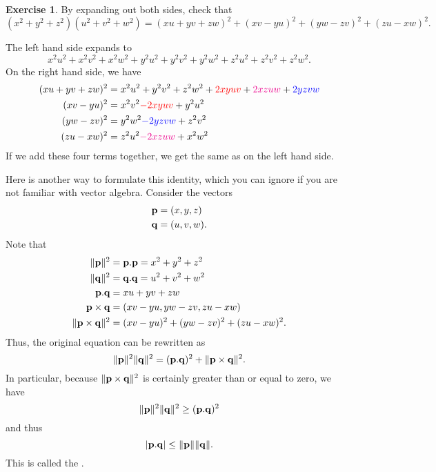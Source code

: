 \documentclass[a4paper]{book}
\theoremstyle{definition}
\newtheorem{exercise}[theorem]{Exercise}
\renewenvironment{solution}{\SolutionInline}{\endSolutionInline}
\begin{document}
\begin{exercise}
 By expanding out both sides, check that
 \[ (x^2+y^2+z^2)(u^2+v^2+w^2) =
    (xu+yv+zw)^2 + (xv-yu)^2 + (yw-zv)^2 + (zu-xw)^2.
 \]
\end{exercise}
\begin{solution}
 The left hand side expands to
 \[ x^2u^2 + x^2v^2 + x^2w^2 +
    y^2u^2 + y^2v^2 + y^2w^2 +
    z^2u^2 + z^2v^2 + z^2w^2.
 \]
 On the right hand side, we have
 \begin{align*}
  (xu+yv+zw)^2 &= x^2u^2 + y^2v^2 + z^2w^2 +
                  {\color{red}     2xyuv} +
                  {\color{magenta} 2xzuw} +
                  {\color{blue}    2yzvw} \\
  (xv-yu)^2    &= x^2v^2
                  {\color{red} -2xyuv}
                  + y^2u^2 \\
  (yw-zv)^2    &= y^2w^2
                  {\color{blue} -2yzvw}
                  + z^2v^2 \\
  (zu-xw)^2    &= z^2u^2
                  {\color{magenta} -2xzuw}
                  + x^2w^2
 \end{align*}
 If we add these four terms together, we get the same as on the left
 hand side.

 Here is another way to formulate this identity, which you can ignore
 if you are not familiar with vector algebra.  Consider the vectors
 \begin{align*}
  \mathbf{p} &= (x,y,z) \\
  \mathbf{q} &= (u,v,w).
 \end{align*}
 Note that
 \begin{align*}
  \|\mathbf{p}\|^2 &= \mathbf{p}.\mathbf{p} = x^2 + y^2 + z^2 \\
  \|\mathbf{q}\|^2 &= \mathbf{q}.\mathbf{q} = u^2 + v^2 + w^2 \\
  \mathbf{p}.\mathbf{q}   &= xu + yv + zw \\
  \mathbf{p}\times\mathbf{q} &= (xv-yu, yw-zv, zu-xw) \\
  \|\mathbf{p}\times\mathbf{q}\|^2 &= (xv-yu)^2 + (yw-zv)^2 + (zu-xw)^2.
 \end{align*}
 Thus, the original equation can be rewritten as
 \[ \|\mathbf{p}\|^2 \|\mathbf{q}\|^2 = (\mathbf{p}.\mathbf{q})^2 + \|\mathbf{p}\times\mathbf{q}\|^2. \]
 In particular, because $\|\mathbf{p}\times\mathbf{q}\|^2$ is certainly greater than or
 equal to zero, we have
 \[ \|\mathbf{p}\|^2 \|\mathbf{q}\|^2 \geq (\mathbf{p}.\mathbf{q})^2 \]
 and thus
 \[ |\mathbf{p}.\mathbf{q}| \leq \|\mathbf{p}\| \|\mathbf{q}\|. \]
 This is called the 
 .
\end{solution}
\end{document}
